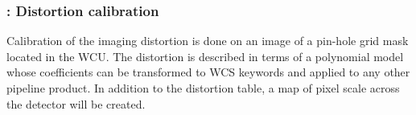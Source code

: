 \clearpage
\subsubsection{:  Distortion calibration}
\label{rec:metis_lm_img_distortion}
\label{lm_img_distortion}
\label{rec:lm_img_distortion}
\label{sssec:lm_img_distortion}

Calibration of the imaging distortion is done on an image of a
pin-hole grid mask located in the \ac{WCU}. The
distortion is described in terms of a polynomial model whose
coefficients can be transformed to WCS keywords and applied to any
other pipeline product. In addition to the distortion table, a map of
pixel scale across the detector will be created.

